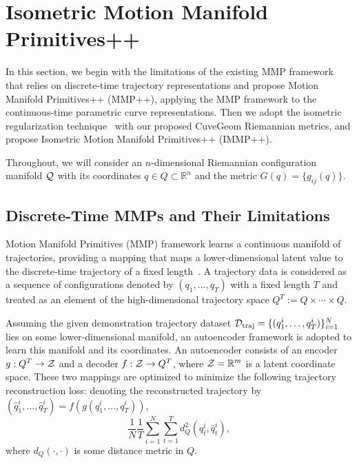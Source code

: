 \section{Isometric Motion Manifold Primitives++}
\label{sec:immp}
In this section, we begin with the limitations of the existing MMP framework that relies on discrete-time trajectory representations and propose Motion Manifold Primitives++ (MMP++), applying the MMP framework to the continuous-time parametric curve representations. Then we adopt the isometric regularization technique~\cite{yonghyeon2022regularized} with our proposed CuveGeom Riemannian metrics, and propose Isometric Motion Manifold Primitives++ (IMMP++).  

Throughout, we will consider an $n$-dimensional Riemannian configuration manifold ${\cal Q}$ with its coordinates $q \in Q \subset \mathbb{R}^{n}$ and the metric $G(q) = \{g_{ij}(q)\}$. 

\subsection{Discrete-Time MMPs and Their Limitations} 
Motion Manifold Primitives (MMP) framework learns a continuous manifold of trajectories, providing a mapping that maps a lower-dimensional latent value to the discrete-time trajectory of a fixed length~\cite{noseworthy2020task,lee2023equivariant}. 
A trajectory data is considered as a sequence of configurations denoted by $(q_1, \ldots, q_T)$ with a fixed length $T$ and treated as an element of the high-dimensional trajectory space $Q^T:=Q\times \cdots \times Q$. 

Assuming the given demonstration trajectory dataset ${\cal D}_{\rm traj} = \{(q^{i}_1,\ldots, q^{i}_T)\}_{i=1}^{N}$ lies on some lower-dimensional manifold, an autoencoder framework is adopted to learn this manifold and its coordinates. An autoencoder consists of an encoder $g:Q^T \to {\cal Z}$ and a decoder $f: {\cal Z} \to Q^T$, where ${\cal Z} = \mathbb{R}^{m}$ is a latent coordinate space. 
These two mappings are optimized to minimize the following trajectory reconstruction loss: denoting the reconstructed trajectory by $(\hat{q}^i_1, \ldots, \hat{q}^i_T) = f(g(q^{i}_1,\ldots, q^{i}_T))$, 
\begin{equation}
\label{eq:recon_loss_discrete}
    \frac{1}{N}\frac{1}{T} \sum_{i=1}^{N} \sum_{t=1}^T d^2_Q(q^i_t, \hat{q}^i_t),
\end{equation}
where $d_Q(\cdot,\cdot)$ is some distance metric in $Q$.  

